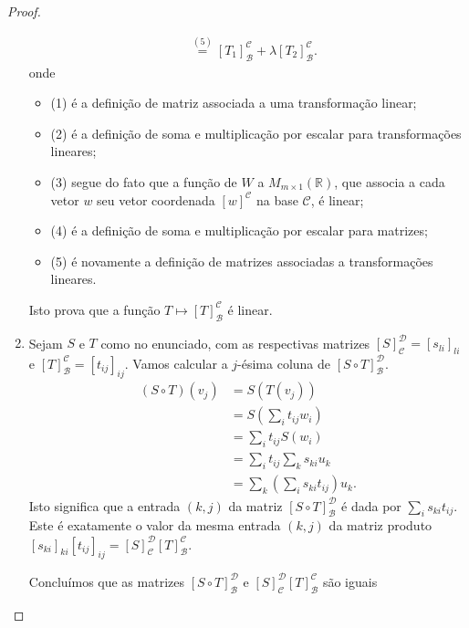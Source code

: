 \begin{proof}
\begin{enumerate}
\begin{align*}
				&\overset{(5)}{=}[T_1]_{\mathcal{B}}^{\mathcal{C}}+\lambda[T_2]_{\mathcal{B}}^{\mathcal{C}}.
		\end{align*}
		onde
		\begin{itemize}
			\item (1) é a definição de matriz associada a uma transformação linear;
			\item (2) é a definição de soma e multiplicação por escalar para transformações lineares;
			\item (3) segue do fato que a função de $W$ a $M_{m\times 1}(\mathbb{R})$, que associa a cada vetor $w$ seu vetor coordenada $[w]^{\mathcal{C}}$ na base $\mathcal{C}$, é linear;
			\item (4) é a definição de soma e multiplicação por escalar para matrizes;
			\item (5) é novamente a definição de matrizes associadas a transformações lineares.
		\end{itemize}
		
		Isto prova que a função $T\mapsto [T]_{\mathcal{B}}^{\mathcal{C}}$ é linear.
		
		\item Sejam $S$ e $T$ como no enunciado, com as respectivas matrizes $[S]_{\mathcal{C}}^{\mathcal{D}}=[s_{li}]_{li}$ e $[T]_{\mathcal{B}}^{\mathcal{C}}=[t_{ij}]_{ij}$. Vamos calcular a $j$-ésima coluna de $[S\circ T]_{\mathcal{B}}^{\mathcal{D}}$.
		\begin{align*}
			(S\circ T)(v_j)
				&=S(T(v_j))\\
				&=S\left(\sum_i t_{ij}w_i\right)\\
				&=\sum_i t_{ij}S(w_i)\\
				&=\sum_it_{ij}\sum_ks_{ki}u_k\\
				&=\sum_k\left(\sum_is_{ki}t_{ij}\right)u_k.
		\end{align*}
		Isto significa que a entrada $(k,j)$ da matriz $[S\circ T]_{\mathcal{B}}^{\mathcal{D}}$ é dada por $\sum_is_{ki}t_{ij}$. Este é exatamente o valor da mesma entrada $(k,j)$ da matriz produto $[s_{ki}]_{ki}[t_{ij}]_{ij}=[S]_{\mathcal{C}}^{\mathcal{D}}[T]_{\mathcal{B}}^{\mathcal{C}}$.
		
		Concluímos que as matrizes $[S\circ T]_{\mathcal{B}}^{\mathcal{D}}$ e $[S]_{\mathcal{C}}^{\mathcal{D}}[T]_{\mathcal{B}}^{\mathcal{C}}$ são iguais
	\end{enumerate}
\end{proof}